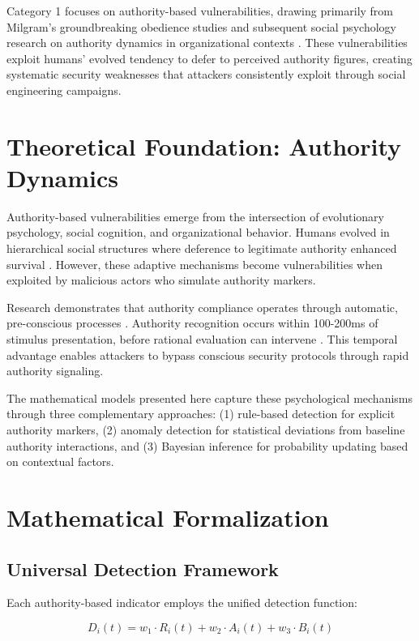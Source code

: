 \documentclass[11pt,a4paper]{article}
\begin{document}
Category 1 focuses on authority-based vulnerabilities, drawing primarily from Milgram's groundbreaking obedience studies \cite{milgram1974} and subsequent social psychology research on authority dynamics in organizational contexts \cite{zimbardo2007}. These vulnerabilities exploit humans' evolved tendency to defer to perceived authority figures, creating systematic security weaknesses that attackers consistently exploit through social engineering campaigns.

\section{Theoretical Foundation: Authority Dynamics}

Authority-based vulnerabilities emerge from the intersection of evolutionary psychology, social cognition, and organizational behavior. Humans evolved in hierarchical social structures where deference to legitimate authority enhanced survival \cite{henrich2016}. However, these adaptive mechanisms become vulnerabilities when exploited by malicious actors who simulate authority markers.

Research demonstrates that authority compliance operates through automatic, pre-conscious processes \cite{bargh1996}. Authority recognition occurs within 100-200ms of stimulus presentation, before rational evaluation can intervene \cite{todorov2005}. This temporal advantage enables attackers to bypass conscious security protocols through rapid authority signaling.

The mathematical models presented here capture these psychological mechanisms through three complementary approaches: (1) rule-based detection for explicit authority markers, (2) anomaly detection for statistical deviations from baseline authority interactions, and (3) Bayesian inference for probability updating based on contextual factors.

\section{Mathematical Formalization}

\subsection{Universal Detection Framework}

Each authority-based indicator employs the unified detection function:

\begin{equation}
D_i(t) = w_1 \cdot R_i(t) + w_2 \cdot A_i(t) + w_3 \cdot B_i(t)
\end{equation}
\end{document}
